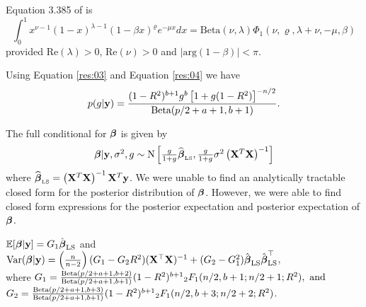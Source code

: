 \documentclass{amsart}[12pt]
\newtheorem{res}{Result}%
\begin{document}
Equation 3.385 of \citep{Gradshteyn1988} is
\begin{equation} \label{res:04}
	\int_{0}^1 x^{\nu - 1} (1 - x)^{\lambda - 1}(1 - \beta x)^{\varrho} e^{-\mu x} dx = \mbox{Beta}(\nu,\lambda) \Phi_1(\nu,\varrho,\lambda+\nu,-\mu,\beta)
\end{equation}
\noindent provided $\mbox{Re}(\lambda)>0$, $\mbox{Re}(\nu)>0$ and $|\mbox{arg}(1-\beta)|<\pi$.

Using Equation \ref{res:03} and Equation \ref{res:04} we have
\begin{equation}\label{res:06}
	p(g|{\bf y}) = \frac{(1 -  R^2)^{b+1} g^{b} \left[  1 + g(1 -  R^2) \right]^{-n/2}}{\mbox{Beta}(p/2 + a + 1,b+1)}.
\end{equation}

 

\noindent The full conditional for ${\boldsymbol \beta}$ is given by
\begin{equation}
	\begin{array}{rl}
		{\boldsymbol\beta}|{\bf y},\sigma^2,g \sim \text{N}\left[                  
		\tfrac{g}{1+g}\widehat{{\boldsymbol \beta}}_{\mbox{\tiny LS}},    
		\tfrac{g}{1+g} \sigma^2 \left( {\bf X}^T{\bf X} \right)^{-1} 
		\right]                                              
	\end{array} 
\end{equation}
\noindent where $\widehat{{\boldsymbol \beta}}_{\mbox{\tiny LS}} = \left( {\bf X}^T{\bf X} \right)^{-1}{\bf X}^T{\bf y}$. We were unable
to find an analytically tractable closed form for the posterior distribution of ${\boldsymbol \beta}$. However, we were
able to find closed form expressions for the posterior expectation and posterior expectation of ${\boldsymbol \beta}$.

$\mathbb{E}[{\boldsymbol \beta} | {\bf y}] = G_1 \hat{{\boldsymbol \beta}}_{\text{LS}}$ and
					$\text{Var}({\boldsymbol \beta} | {\bf y}) = \left( \frac{n}{n - 2} \right) (G_1 - G_2 R^2) ({\bf X}^\top {\bf X})^{-1} + (G_2 - G_1^2) \hat{{\boldsymbol \beta}}_{\text{LS}} \hat{{\boldsymbol \beta}}_{\text{LS}}^\top$,
	\\ where
	$G_1 = \frac{\text{Beta}(p/2 + a + 1, b + 2)}{\text{Beta}(p /2 + a + 1, b + 1)} (1 - R^2)^{b+1} {}_2 F_1(n/2, b + 1; n/2 + 1; R^2), \text{ and }$ \\
	$G_2 = \frac{\text{Beta}(p/2 + a + 1, b + 3)}{\text{Beta}(p /2 + a + 1, b + 1)} (1 - R^2)^{b+1} {}_2 F_1(n/2, b + 3; n/2 + 2; R^2)$.
\end{document}
